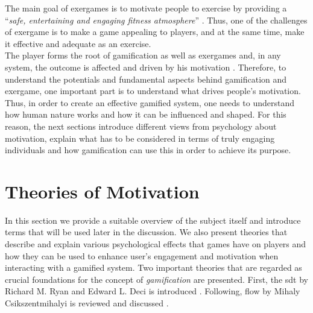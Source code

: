The main goal of exergames is to motivate people to exercise by providing a ``\textit{safe, entertaining and engaging fitness atmosphere}'' \cite{altamimi2012survey}. Thus, one of the challenges of exergame is to make a game appealing to players, and at the same time, make it effective and adequate as an exercise. \\
The player forms the root of gamification as well as exergames and, in any system, the outcome is affected and driven by his motivation \cite{zichermann2011gamification}. Therefore, to understand the potentials and fundamental aspects behind gamification and exergame, one important part is to understand what drives people's motivation. Thus, in  order  to  create  an  effective  gamified system, one needs to understand  how  human  nature  works  and  how  it can be influenced and shaped. For this reason, the next sections introduce different views from psychology about motivation, explain what has to be considered in terms of truly engaging individuals and how gamification can use this in order to achieve its purpose. 

\section{Theories of Motivation}
\label{chapter:motivation}
In this section we provide a suitable overview of the subject itself and introduce terms that will be used later in the discussion. We also present theories that describe and explain various psychological effects that games have on players and how they can be used to enhance user's engagement and motivation when interacting with a gamified system. Two important theories that are regarded as crucial foundations for the concept of \textit{gamification} are presented. First, the \acrfull{sdt} by Richard M. Ryan and Edward L. Deci is introduced \cite{deci1994promoting, ryan2000intrinsic, ryan2000self, deci2000and}. Following, \acrfull{flow} by Mihaly Csikszentmihalyi is reviewed and discussed \cite{csikszentmihalyi1996flow}. 
